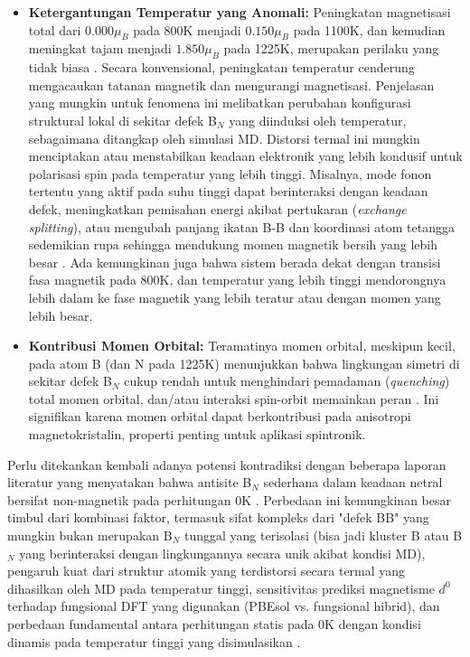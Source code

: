\begin{itemize}
    \item \textbf{Ketergantungan Temperatur yang Anomali:} Peningkatan magnetisasi total dari $0.000 \mu_B$ pada 800K menjadi $0.150 \mu_B$ pada 1100K, dan kemudian meningkat tajam menjadi $1.850 \mu_B$ pada 1225K, merupakan perilaku yang tidak biasa \cite{[1, 1]}. Secara konvensional, peningkatan temperatur cenderung mengacaukan tatanan magnetik dan mengurangi magnetisasi. Penjelasan yang mungkin untuk fenomena ini melibatkan perubahan konfigurasi struktural lokal di sekitar defek B$_N$ yang diinduksi oleh temperatur, sebagaimana ditangkap oleh simulasi MD. Distorsi termal ini mungkin menciptakan atau menstabilkan keadaan elektronik yang lebih kondusif untuk polarisasi spin pada temperatur yang lebih tinggi. Misalnya, mode fonon tertentu yang aktif pada suhu tinggi dapat berinteraksi dengan keadaan defek, meningkatkan pemisahan energi akibat pertukaran (\textit{exchange splitting}), atau mengubah panjang ikatan B-B dan koordinasi atom tetangga sedemikian rupa sehingga mendukung momen magnetik bersih yang lebih besar \cite{[1]}. Ada kemungkinan juga bahwa sistem berada dekat dengan transisi fasa magnetik pada 800K, dan temperatur yang lebih tinggi mendorongnya lebih dalam ke fase magnetik yang lebih teratur atau dengan momen yang lebih besar.
    \item \textbf{Kontribusi Momen Orbital:} Teramatinya momen orbital, meskipun kecil, pada atom B (dan N pada 1225K) menunjukkan bahwa lingkungan simetri di sekitar defek B$_N$ cukup rendah untuk menghindari pemadaman (\textit{quenching}) total momen orbital, dan/atau interaksi spin-orbit memainkan peran \cite{[1]}. Ini signifikan karena momen orbital dapat berkontribusi pada anisotropi magnetokristalin, properti penting untuk aplikasi spintronik.
\end{itemize}
Perlu ditekankan kembali adanya potensi kontradiksi dengan beberapa laporan literatur yang menyatakan bahwa antisite B$_N$ sederhana dalam keadaan netral bersifat non-magnetik pada perhitungan 0K \cite{[1, 4]}. Perbedaan ini kemungkinan besar timbul dari kombinasi faktor, termasuk sifat kompleks dari "defek BB" yang mungkin bukan merupakan B$_N$ tunggal yang terisolasi (bisa jadi kluster B atau B$_N$ yang berinteraksi dengan lingkungannya secara unik akibat kondisi MD), pengaruh kuat dari struktur atomik yang terdistorsi secara termal yang dihasilkan oleh MD pada temperatur tinggi, sensitivitas prediksi magnetisme $d^0$ terhadap fungsional DFT yang digunakan (PBEsol vs. fungsional hibrid), dan perbedaan fundamental antara perhitungan statis pada 0K dengan kondisi dinamis pada temperatur tinggi yang disimulasikan \cite{[1]}.

